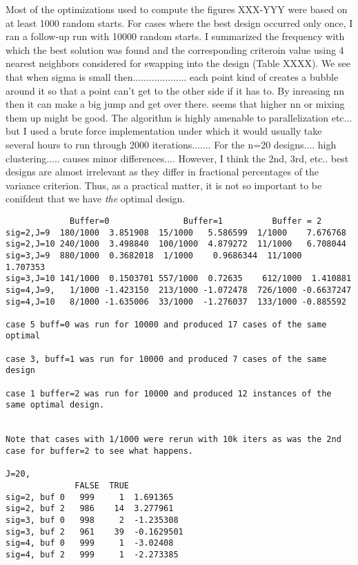 \documentclass[useAMS,referee]{biom}
\begin{document}
Most of the optimizations used to compute the figures XXX-YYY were
based on at least 1000 random starts. For cases where the best design
occurred only once, I ran a follow-up run with 10000 random starts.
I summarized the
frequency with which the best solution was found and the
corresponding criteroin value using 4 nearest neighbors considered for
swapping into the design (Table XXXX).
We see 
that when sigma is small then....................
each point kind of creates a bubble around it so that a point can't
get to the other side if it has to. By inreasing nn then it can make a
big jump and get over there.  seems that higher nn or mixing them up
might be good. The algorithm is highly amenable to parallelization
etc... but I used a brute force implementation under which it would
usually take several hours to run through 2000 iterations.......
For the n=20 designs.... high clustering..... causes minor differences....
 However, I think the 2nd, 3rd, etc.. best designs are
almost irrelevant as they differ in fractional percentages of the
variance criterion. Thus, as a practical matter, it is not so
important to be conifdent that we have {\it the} optimal design.

\begin{verbatim}
             Buffer=0               Buffer=1          Buffer = 2
sig=2,J=9  180/1000  3.851908  15/1000   5.586599  1/1000    7.676768
sig=2,J=10 240/1000  3.498840  100/1000  4.879272  11/1000   6.708044
sig=3,J=9  880/1000  0.3682018  1/1000    0.9686344  11/1000   1.707353
sig=3,J=10 141/1000  0.1503701 557/1000  0.72635    612/1000  1.410881
sig=4,J=9,   1/1000 -1.423150  213/1000 -1.072478  726/1000 -0.6637247
sig=4,J=10   8/1000 -1.635006  33/1000  -1.276037  133/1000 -0.885592

case 5 buff=0 was run for 10000 and produced 17 cases of the same
optimal

case 3, buff=1 was run for 10000 and produced 7 cases of the same
design

case 1 buffer=2 was run for 10000 and produced 12 instances of the
same optimal design.


Note that cases with 1/1000 were rerun with 10k iters as was the 2nd
case for buffer=2 to see what happens.

J=20,
              FALSE  TRUE 
sig=2, buf 0   999     1  1.691365
sig=2, buf 2   986    14  3.277961
sig=3, buf 0   998     2  -1.235308
sig=3, buf 2   961    39  -0.1629501
sig=4, buf 0   999     1  -3.02408
sig=4, buf 2   999     1  -2.273385
\end{verbatim}
\end{document}
